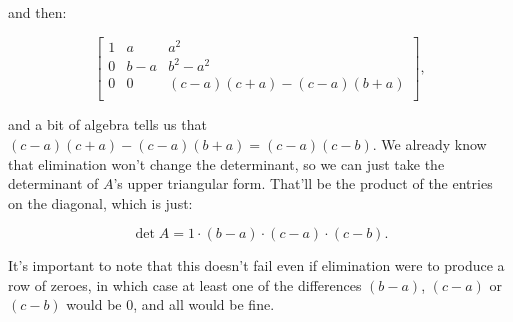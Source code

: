 \documentclass{article}
\begin{document}
and then:

\[
\begin{bmatrix}
1 & a & a^{2}\\
0 & b - a & b^{2} - a^{2}\\
0 & 0 & (c - a)(c + a) - (c - a)(b + a)\\
\end{bmatrix},
\]

and a bit of algebra tells us that $(c - a)(c + a) - (c - a)(b + a) = (c - a)(c - b)$. We already know that elimination won't change the determinant, so we can just take the determinant of $A$'s upper triangular form. That'll be the product of the entries on the diagonal, which is just:

\[
\det A = 1 \cdot (b - a) \cdot (c - a) \cdot (c - b).
\]

It's important to note that this doesn't fail even if elimination were to produce a row of zeroes, in which case at least one of the differences $(b - a)$, $(c - a)$ or $(c - b)$ would be 0, and all would be fine.
\end{document}
